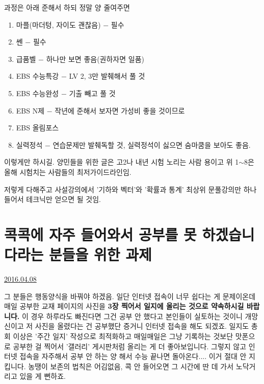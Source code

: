 과정은 아래 준해서 하되 정말 양 줄여주면
\vspace{5mm}
\begin{enumerate}
    \item 마플(마더텅, 자이도 괜찮음) $-$ 필수
    \item 쎈 $-$ 필수
    \item 급품벨 $-$ 하나만 보면 좋음(권하자면 일품)
    \item EBS 수능특강 $-$ LV 2, 3만 발췌해서 풀 것
    \item EBS 수능완성 $-$ 기출 빼고 풀 것
    \item EBS N제 $-$ 작년에 준해서 보자면 가성비 좋을 것이므로
    \item EBS 올림포스
    \item 실력정석 $-$ 연습문제만 발췌독할 것, 실력정석이 싫으면 숨마쿰을 보아도 좋음.
\end{enumerate}
\vspace{5mm}

이렇게만 하시길.
양민들을 위한 글은 고2나 내년 시험 노리는 사람 용이고
위 1$\sim$8은 올해 시험치는 사람들의 최저가이드라인임.
\vspace{5mm}

저렇게 다해주고 사설강의에서 '기하와 벡터'와 '확률과 통계' 최상위 문풀강의만 하나 들어서 테크닉만 얻으면 될 것임.
\vspace{5mm}






\section{콕콕에 자주 들어와서 공부를 못 하겠습니다라는 분들을 위한 과제}
\href{https://www.kockoc.com/Apoc/719106}{2016.04.08}

\vspace{5mm}

그 분들은 행동양식을 바꿔야 하겠음.
일단 인터넷 접속이 너무 쉽다는 게 문제이온데
매일 공부한 교재 페이지의 사진을 \textbf{3장 찍어서 일지에 올리는 것으로 약속하시길 바랍니다.}
이 경우 하루라도 빠진다면 그건 공부 안 했다고 본인들이 실토하는 것이니 개망신이고  저 사진을 올렸다는 건 공부했단 증거니 인터넷 접속을 해도 되겠죠.
일지도 총회 이상은 '주간 일지' 작성으로 최적화하고  매일매일은 그냥 기록하는 것보단 맛폰으로 공부한 걸 찍어서 '갤러리' 게시판처럼 올리는 게 더 좋아보입니다.
그렇지 않고 인터넷 접속을 자주해서 공부 안 하는 양 해서 수능 끝나면 돌아온다.... 이거 절대 안 지킵니다.
농땡이 보존의 법칙은 어김없음, 콕 안 들어오면 그 시간에 딴 데 가서 노닥거리고 있을 게 뻔하죠.









